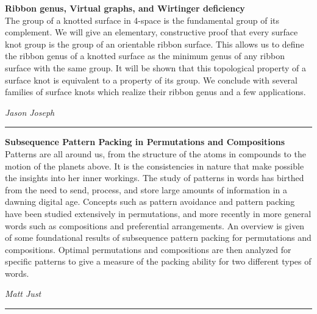 \documentclass[oneside]{amsart}
\begin{document}
\filbreak
\hspace{-20pt}\textbf{ \textbf{ Ribbon genus, Virtual graphs, and Wirtinger deficiency } } \vspace{0.5em}\\
The group of a knotted surface in 4-space is the fundamental group of its complement. We will give an elementary, constructive proof that every surface knot group is the group of an orientable ribbon surface. This allows us to define the ribbon genus of a knotted surface as the minimum genus of any ribbon surface with the same group. It will be shown that this topological property of a surface knot is equivalent to a property of its group. We conclude with several families of surface knots which realize their ribbon genus and a few applications. \vspace{-1em}\\
\begin{flushright} \textit{ Jason Joseph } \vspace{0.5em} \end{flushright}
\rule{\textwidth}{0.4pt}
\vspace{0.5em}

\filbreak
\hspace{-20pt}\textbf{ \textbf{ Subsequence Pattern Packing in Permutations and Compositions } } \vspace{0.5em}\\
Patterns are all around us, from the structure of the atoms in compounds to the motion of the planets above. It is the consistencies in nature that make possible the insights into her inner workings. The study of patterns in words has birthed from the need to send, process, and store large amounts of information in a dawning digital age. Concepts such as pattern avoidance and pattern packing have been studied extensively in permutations, and more recently in more general words such as compositions and preferential arrangements. An overview is given of some foundational results of subsequence pattern packing for permutations and compositions. Optimal permutations and compositions are then analyzed for specific patterns to give a measure of the packing ability for two different types of words. \vspace{-1em}\\
\begin{flushright} \textit{ Matt Just } \vspace{0.5em} \end{flushright}
\rule{\textwidth}{0.4pt}
\vspace{0.5em}
\end{document}
